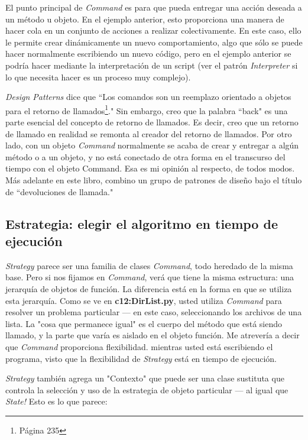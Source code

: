 El punto principal de \textit{Command} es para que pueda entregar una acción deseada a un método u objeto. En el ejemplo anterior, esto proporciona una manera de hacer cola en un conjunto de acciones a realizar colectivamente. En este caso, ello le permite crear dinámicamente un nuevo comportamiento, algo que sólo se puede hacer normalmente escribiendo un nuevo código, pero en el ejemplo anterior se podría hacer mediante la interpretación de un script (ver el patrón \textit{Interpreter} si lo que necesita hacer es un proceso muy complejo). \newline

\textit{Design Patterns} dice que “Los comandos son un reemplazo orientado a objetos para el retorno de llamados\footnote{Página 235}." Sin embargo, creo que la palabra “back" es una parte esencial del concepto de retorno de llamados. Es decir, creo que un retorno de llamado en realidad se remonta al creador del retorno de llamados. Por otro lado, con un objeto \textit{Command} normalmente se acaba de crear y entregar a algún método o a un objeto,  y no está conectado de otra forma en el transcurso del tiempo con el objeto Command. Esa es mi opinión al respecto, de todos modos. Más adelante en este libro, combino un grupo de patrones de diseño bajo el título de “devoluciones de llamada."  \newline

\subsection*{Estrategia: elegir el algoritmo en tiempo de ejecución}
\label{subsec:eeeaetde}


\textit{Strategy} parece ser una familia de clases \textit{Command}, todo heredado de la misma base. Pero si nos fijamos en \textit{Command}, verá que tiene la misma estructura: una jerarquía de objetos de función. La diferencia está en la forma en que se utiliza esta jerarquía. Como se ve en \textbf{c12:DirList.py}, usted utiliza \textit{Command} para resolver un problema particular — en este caso, seleccionando los archivos de una lista. La "cosa que permanece igual" es el cuerpo del método que está siendo llamado, y la parte que varía es aislado en el objeto función. Me atrevería a decir que \textit{Command} proporciona flexibilidad. mientras usted está escribiendo el programa, visto que la flexibilidad de \textit{Strategy} está en tiempo de ejecución. 

\textit{Strategy} también agrega un "Contexto" que puede ser una clase sustituta que controla la selección y uso de la estrategia de objeto particular — al igual que \textit{State!} Esto es lo que parece:   \newpage

